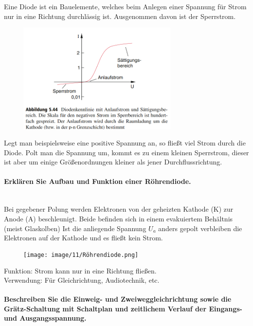 \documentclass[a4paper, 11pt, ngerman, parskip=half-]{scrartcl}
\newcommand{\myparagraph}[1]{\paragraph{#1}\mbox{}\\}
\begin{document}
Eine Diode ist ein Bauelemente, welches beim Anlegen einer Spannung für Strom nur in eine Richtung durchlässig ist. Ausgenommen davon ist der Sperrstrom.
\begin{figure}[H]
    \centering
    \includegraphics[width=8cm]{image/11/Diode_Kennlinie.png}
\end{figure}
Legt man beispielsweise eine positive Spannung an, so fließt viel Strom durch die Diode. Polt man die Spannung um, kommt es zu einem kleinen
Sperrstrom, dieser ist aber um einige Größenordnungen kleiner als jener Durchflussrichtung.
\myparagraph{Erklären Sie Aufbau und Funktion einer Röhrendiode.}
\hypertarget{diode_link}{Bei} gegebener Polung werden Elektronen von der geheizten Kathode (K) zur Anode (A) beschleunigt. Beide befinden sich in einem evakuiertem Behältnis (meist Glaskolben)
Ist die anliegende Spannung $U_a$ anders gepolt verbleiben die Elektronen auf der Kathode und es fließt kein Strom.
\begin{figure}[H]
    \centering
    \texttt{[image: image/11/Röhrendiode.png]}
\end{figure}
Funktion: Strom kann nur in eine Richtung fließen. \\
Verwendung: Für Gleichrichtung, Audiotechnik, etc.
\myparagraph{Beschreiben Sie die Einweig- und Zweiweggleichrichtung sowie die Grätz-Schaltung mit
    Schaltplan und zeitlichem Verlauf der Eingangs- und Ausgangsspannung.}
\end{document}
